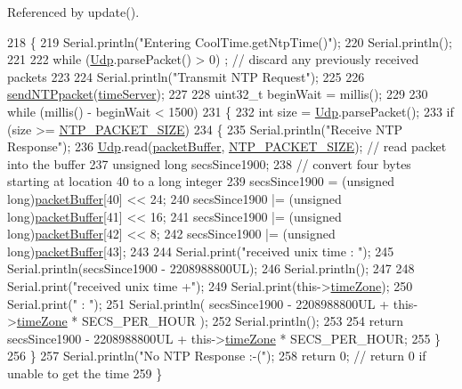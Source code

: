 Referenced by update().


\begin{DoxyCode}
218 \{
219     Serial.println(\textcolor{stringliteral}{"Entering CoolTime.getNtpTime()"});
220     Serial.println();
221 
222     \textcolor{keywordflow}{while} (\hyperlink{classCoolTime_a4e23216a8121ca79d0fb019f30884b92}{Udp}.parsePacket() > 0) ; \textcolor{comment}{// discard any previously received packets}
223     
224     Serial.println(\textcolor{stringliteral}{"Transmit NTP Request"});
225 
226     \hyperlink{classCoolTime_a236a38d120dc53bc67456d763838c5a1}{sendNTPpacket}(\hyperlink{classCoolTime_ad2b9858f399108cb440dd1e908916f04}{timeServer});
227 
228     uint32\_t beginWait = millis();
229 
230     \textcolor{keywordflow}{while} (millis() - beginWait < 1500) 
231     \{
232         \textcolor{keywordtype}{int} size = \hyperlink{classCoolTime_a4e23216a8121ca79d0fb019f30884b92}{Udp}.parsePacket();
233         \textcolor{keywordflow}{if} (size >= \hyperlink{CoolTime_8h_a56a6ea64006651b4f42adf713e244f06}{NTP\_PACKET\_SIZE}) 
234         \{
235             Serial.println(\textcolor{stringliteral}{"Receive NTP Response"});
236             \hyperlink{classCoolTime_a4e23216a8121ca79d0fb019f30884b92}{Udp}.read(\hyperlink{classCoolTime_a27e6abc82a5c2f72161956967005bec7}{packetBuffer}, \hyperlink{CoolTime_8h_a56a6ea64006651b4f42adf713e244f06}{NTP\_PACKET\_SIZE});  \textcolor{comment}{// read packet into the
       buffer}
237             \textcolor{keywordtype}{unsigned} \textcolor{keywordtype}{long} secsSince1900;
238             \textcolor{comment}{// convert four bytes starting at location 40 to a long integer}
239             secsSince1900 =  (\textcolor{keywordtype}{unsigned} long)\hyperlink{classCoolTime_a27e6abc82a5c2f72161956967005bec7}{packetBuffer}[40] << 24;
240             secsSince1900 |= (\textcolor{keywordtype}{unsigned} long)\hyperlink{classCoolTime_a27e6abc82a5c2f72161956967005bec7}{packetBuffer}[41] << 16;
241             secsSince1900 |= (\textcolor{keywordtype}{unsigned} long)\hyperlink{classCoolTime_a27e6abc82a5c2f72161956967005bec7}{packetBuffer}[42] << 8;
242             secsSince1900 |= (\textcolor{keywordtype}{unsigned} long)\hyperlink{classCoolTime_a27e6abc82a5c2f72161956967005bec7}{packetBuffer}[43];
243             
244             Serial.print(\textcolor{stringliteral}{"received unix time : "});
245             Serial.println(secsSince1900 - 2208988800UL);
246             Serial.println();
247 
248             Serial.print(\textcolor{stringliteral}{"received unix time +"});
249             Serial.print(this->\hyperlink{classCoolTime_a1916d98810c2a4e9ba72867e8c1b9a99}{timeZone});
250             Serial.print(\textcolor{stringliteral}{" : "});
251             Serial.println( secsSince1900 - 2208988800UL + this->\hyperlink{classCoolTime_a1916d98810c2a4e9ba72867e8c1b9a99}{timeZone} * SECS\_PER\_HOUR );
252             Serial.println();
253             
254             \textcolor{keywordflow}{return} secsSince1900 - 2208988800UL + this->\hyperlink{classCoolTime_a1916d98810c2a4e9ba72867e8c1b9a99}{timeZone} * SECS\_PER\_HOUR;
255         \}
256     \}
257     Serial.println(\textcolor{stringliteral}{"No NTP Response :-("});
258     \textcolor{keywordflow}{return} 0; \textcolor{comment}{// return 0 if unable to get the time}
259 \}
\end{DoxyCode}
